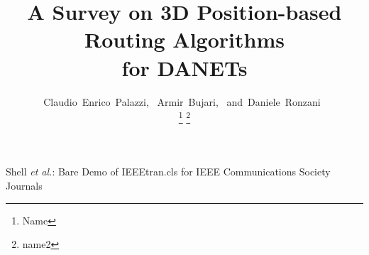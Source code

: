 \documentclass[journal,comsoc]{IEEEtran}
\begin{document}
%
\title{A Survey on 3D Position-based Routing Algorithms\\for DANETs }
%
%
%

\author{Claudio~Enrico~Palazzi,~
        Armir~Bujari,~\IEEEmembership{}
        and~Daniele~Ronzani~\IEEEmembership{}%

\thanks{Name} \thanks{name2}%
}

% 
%



%
{Shell \MakeLowercase{\textit{et al.}}: Bare Demo of IEEEtran.cls for IEEE Communications Society Journals}
% 
\end{document}
